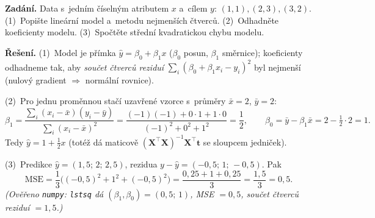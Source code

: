 \begin{priklad}
\par
\textbf{Zadání.} Data s~jedním číselným atributem $x$ a~cílem $y$: $(1,1),(2,3),(3,2)$. (1)~Popište lineární model a~metodu nejmenších čtverců. (2)~Odhadněte koeficienty modelu. (3)~Spočtěte střední kvadratickou chybu modelu.

\smallskip
\textbf{Řešení.} (1)~Model je přímka $\hat y=\beta_0+\beta_1 x$ ($\beta_0$ posun, $\beta_1$ směrnice); koeficienty odhadneme tak, aby \emph{součet čtverců reziduí} $\sum_i(\beta_0+\beta_1 x_i-y_i)^2$ byl nejmenší (nulový gradient $\Rightarrow$ normální rovnice).

(2)~Pro jednu proměnnou stačí uzavřené vzorce s~průměry $\bar x=2$, $\bar y=2$:
\[ \beta_1=\frac{\sum_i(x_i-\bar x)(y_i-\bar y)}{\sum_i(x_i-\bar x)^2}=\frac{(-1)(-1)+0\cdot1+1\cdot0}{(-1)^2+0^2+1^2}=\frac{1}{2},\qquad \beta_0=\bar y-\beta_1\bar x=2-\tfrac12\cdot2=1. \]
Tedy $\boxed{\hat y=1+\tfrac12 x}$ (totéž dá maticově $(\mathbf{X}^{\!\top}\mathbf{X})^{-1}\mathbf{X}^{\!\top}\mathbf{t}$ se sloupcem jedniček).

(3)~Predikce $\hat y=(1{,}5;\,2;\,2{,}5)$, rezidua $y-\hat y=(-0{,}5;\,1;\,-0{,}5)$. Pak
\[ \mathrm{MSE}=\frac13\big((-0{,}5)^2+1^2+(-0{,}5)^2\big)=\frac{0{,}25+1+0{,}25}{3}=\frac{1{,}5}{3}=\boxed{0{,}5}. \]
\emph{(Ověřeno \texttt{numpy}: \texttt{lstsq} dá $(\beta_1,\beta_0)=(0{,}5;\,1)$, MSE $=0{,}5$, součet čtverců reziduí $=1{,}5$.)}


\end{priklad}
